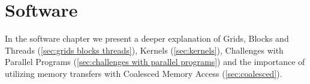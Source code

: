 \chapter{Software}
\label{chap:software}

In the software chapter we present a deeper explanation of Grids, Blocks and Threads (\cref{sec:grids blocks threads}), Kernels (\cref{sec:kernels}), Challenges with Parallel Programs (\cref{sec:challenges with parallel programs}) and the importance of utilizing memory transfers with Coalesced Memory Access (\cref{sec:coalesced}).





